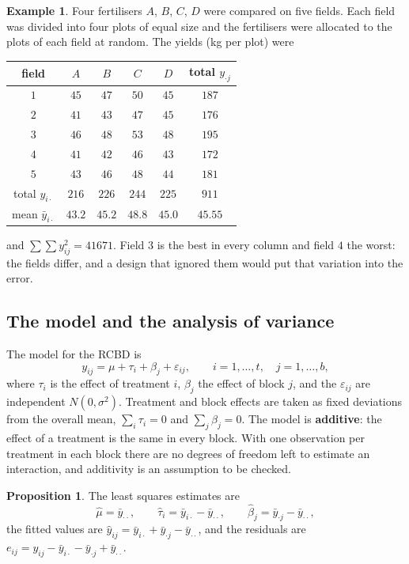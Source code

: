 \documentclass[11pt,a4paper]{article}
\numberwithin{equation}{section}
\theoremstyle{definition}
\newtheorem{exa}[thm]{Example}
\newtheorem{prop}[thm]{Proposition}
\begin{document}
\begin{exa}\label{exa:fertiliser}
Four fertilisers $A$, $B$, $C$, $D$ were compared on five fields. Each field was divided into four plots of equal size and the fertilisers were
allocated to the plots of each field at random. The yields (kg per plot) were
\begin{center}
\begin{tabular}{c|cccc|c}
field & $A$ & $B$ & $C$ & $D$ & total $y_{\cdot j}$ \\
\hline
$1$ & $45$ & $47$ & $50$ & $45$ & $187$ \\
$2$ & $41$ & $43$ & $47$ & $45$ & $176$ \\
$3$ & $46$ & $48$ & $53$ & $48$ & $195$ \\
$4$ & $41$ & $42$ & $46$ & $43$ & $172$ \\
$5$ & $43$ & $46$ & $48$ & $44$ & $181$ \\
\hline
total $y_{i\cdot}$ & $216$ & $226$ & $244$ & $225$ & $911$ \\
mean $\bar y_{i\cdot}$ & $43.2$ & $45.2$ & $48.8$ & $45.0$ & $45.55$
\end{tabular}
\end{center}
and $\sum\sum y_{ij}^2 = 41671$. Field $3$ is the best in every column and field $4$ the worst: the fields differ, and a design that ignored them would
put that variation into the error.
\end{exa}

\subsection{The model and the analysis of variance}
The model for the RCBD is
\[
y_{ij} = \mu + \tau_i + \beta_j + \varepsilon_{ij} , \qquad i = 1, \dots, t , \quad j = 1, \dots, b ,
\]
where $\tau_i$ is the effect of treatment $i$, $\beta_j$ the effect of block $j$, and the $\varepsilon_{ij}$ are independent $N(0, \sigma^2)$. Treatment and block effects are
taken as fixed deviations from the overall mean, $\sum_i\tau_i = 0$ and $\sum_j\beta_j = 0$. The model is \textbf{additive}: the effect of a treatment is the same in
every block. With one observation per treatment in each block there are no degrees of freedom left to estimate an interaction, and additivity is
an assumption to be checked.

\begin{prop}\label{prop:rcbd-estimates}
The least squares estimates are
\[
\hat\mu = \bar y_{\cdot\cdot} , \qquad \hat\tau_i = \bar y_{i\cdot} - \bar y_{\cdot\cdot} , \qquad \hat\beta_j = \bar y_{\cdot j} - \bar y_{\cdot\cdot} ,
\]
the fitted values are $\hat y_{ij} = \bar y_{i\cdot} + \bar y_{\cdot j} - \bar y_{\cdot\cdot}$, and the residuals are $e_{ij} = y_{ij} - \bar y_{i\cdot} - \bar y_{\cdot j} + \bar y_{\cdot\cdot}$.
\end{prop}
\end{document}
